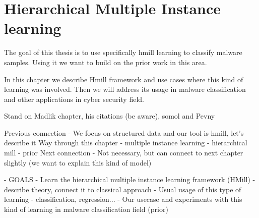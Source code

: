 \chapter{Hierarchical Multiple Instance learning}
The goal of this thesis is to use specifically hmill learning to classify malware samples. Using it we want to  build on the prior work in this area. 

In this chapter we describe Hmill framework and use cases where this kind of learning was involved. Then we will address its usage in malware classification and other applications in cyber security field.


Stand on Madlik chapter, his citations (be aware), somol and Pevny

Previous connection
- We focus on structured data and our tool is hmill, let's describe it
Way through this chapter
- multiple instance learning
- hierarchical mill
- prior
Next connection
- Not necessary, but can connect to next chapter slightly (we want to explain this kind of model)




- GOALS 
- Learn the hierarchical multiple instance learning framework (HMill)
- describe theory, connect it to classical approach
- Usual usage of this type of learning - classification, regression...
- Our usecase and experiments with this kind of learning in malware classification field (prior)